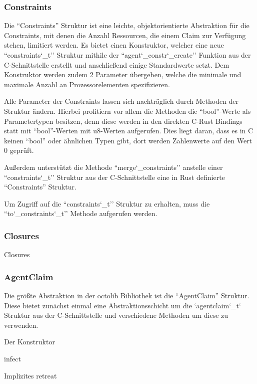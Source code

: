 \subsubsection{Constraints}

Die ``Constraints'' Struktur ist eine leichte, objektorientierte Abstraktion für die Constraints, mit denen die Anzahl Ressourcen, die
einem Claim zur Verfügung stehen, limitiert werden.
Es bietet einen Konstruktor, welcher eine neue ``constraints\char`_t'' Struktur mithile der ``agent\char`_constr\char`_create''
Funktion aus der C-Schnittstelle erstellt und anschließend einige Standardwerte setzt. Dem Konstruktor werden
zudem 2 Parameter übergeben, welche die minimale und maximale Anzahl an Prozessorelementen spezifizieren.

Alle Parameter der Constraints lassen sich nachträglich durch Methoden der Struktur ändern. Hierbei profitiern vor allem die Methoden
die ``bool''-Werte als Parametertypen besitzen, denn diese werden in den direkten C-Rust Bindings statt mit ``bool''-Werten mit
u8-Werten aufgerufen. Dies liegt daran, dass es in C keinen ``bool'' oder ähnlichen Typen gibt, dort werden Zahlenwerte auf den
Wert 0 geprüft.

Außerdem unterstützt die Methode ``merge\char`_constraints'' anstelle einer ``constraints\char`_t'' Struktur aus der
C-Schnittstelle eine in Rust definierte ``Constraints'' Struktur.

Um Zugriff auf die ``constraints\char`_t'' Struktur zu erhalten, muss die ``to\char`_constraints\char`_t'' Methode aufgerufen werden.

\subsubsection{Closures}

Closures

\subsubsection{AgentClaim}

Die größte Abstraktion in der octolib Bibliothek ist die ``AgentClaim'' Struktur. Diese bietet zunächst einmal eine Abstraktionsschicht
um die `agentclaim\char`_t` Struktur aus der C-Schnittstelle und verschiedene Methoden um diese zu verwenden.

Der Konstruktor 


infect

Implizites retreat



